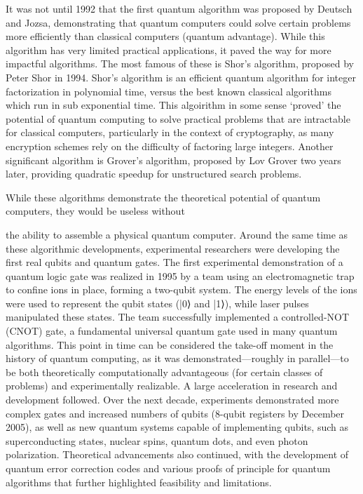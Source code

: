 \documentclass{elbioimp2}
\begin{document}
It was not until 1992 that the first quantum algorithm was proposed by Deutsch and Jozsa\cite{Deutsch1992RapidSO},
demonstrating that quantum computers could solve certain problems more efficiently than classical computers 
(quantum advantage). While this algorithm has very limited practical applications, it paved the way for more 
impactful algorithms.
The most famous of these is Shor's algorithm, proposed by Peter Shor in 1994\cite{365700}. Shor's algorithm 
is an efficient quantum algorithm for integer factorization in polynomial time, versus the best known classical
algorithms which run in sub exponential time. This algoirithm in some sense `proved' the potential of quantum computing
to solve practical problems that are intractable for classical computers, particularly in the context of cryptography, as
many encryption schemes rely on the difficulty of factoring large integers. 
Another significant algorithm is Grover's algorithm, proposed by Lov Grover two years later\cite{grover1996fastquantummechanicalalgorithm}, providing
quadratic speedup for unstructured search problems.

While these algorithms demonstrate the theoretical potential of quantum computers, they would be useless without

the ability to assemble a physical quantum computer. Around the same time as these algorithmic developments, experimental researchers were developing the first real qubits and quantum gates. The first experimental demonstration of a quantum logic gate was realized in 1995 by a team using an electromagnetic trap to confine ions in place, forming a two-qubit system. The energy levels of the ions were used to represent the qubit states (|0⟩ and |1⟩), while laser pulses manipulated these states. The team successfully implemented a controlled-NOT (CNOT) gate, a fundamental universal quantum gate used in many quantum algorithms\cite{PhysRevLett.75.4714}.
This point in time can be considered the take-off moment in the history of quantum computing, as it was demonstrated—roughly in parallel—to be both theoretically computationally advantageous (for certain classes of problems) and experimentally realizable. A large acceleration in research and development followed. Over the next decade, experiments demonstrated more complex gates and increased numbers of qubits (8-qubit registers by December 2005)\cite{8bitregister}, as well as new quantum systems capable of implementing qubits, such as superconducting states, nuclear spins, quantum dots, and even photon polarization. Theoretical advancements also continued, with the development of quantum error correction codes and various proofs of principle for quantum algorithms that further highlighted feasibility and limitations.
\end{document}
